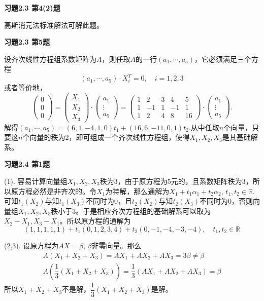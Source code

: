 \newpageorvspace

{\bf 习题2.3 第4(2)题}

高斯消元法标准解法可解此题。

\newpageorvspace

{\bf 习题2.3 第5题}

设齐次线性方程组系数矩阵为$A$，则任取$A$的一行$(a_1,\cdots,a_5)$，它必须满足三个方程
$$(a_1,\cdots,a_5) \cdot X_i^T = 0, \quad i=1,2,3$$
或者等价地，
$$\begin{pmatrix} 0 \\ 0 \\ 0 \end{pmatrix} = \begin{pmatrix} X_1 \\ X_2 \\ X_3 \end{pmatrix} \cdot \begin{pmatrix} a_1 \\ \vdots \\ a_5 \end{pmatrix} = \begin{pmatrix} 1 & 2 & 3 & 4 & 5 \\ 1 & -1 & 1 & -1 & 1 \\ 1 & 2 & 4 & 8 & 16 \end{pmatrix} \cdot \begin{pmatrix} a_1 \\ \vdots \\ a_5 \end{pmatrix}.$$
解得$(a_1,\cdots,a_5) = (6,1,-4,1,0) t_1 + (16,6,-11,0,1) t_2$.从中任取$n$个向量，只要这$n$个向量的秩为$2$，即可组成一个齐次线性方程组，使得$X_1,X_2,X_3$是其基础解系。

\newpageorvspace

{\bf 习题2.4 第1题}

(1). 容易计算向量组$X_1,X_2,X_3$秩为3，由于原方程为5元的，且系数矩阵秩为3，所以原方程必然是非齐次的。令$X_1$为特解，那么通解为$X_1+t_1\alpha_1+t_2\alpha_2$, $t_1,t_2\in\mathbb{R}$. 可知$t_1(X_2)$与知$t_1(X_3)$不同时为0，且$t_2(X_2)$与知$t_2(X_3)$不同时为0，否则向量组$X_1,X_2,X_3$秩小于3。于是相应齐次方程组的基础解系可以取为$X_2-X_1,X_3-X_1$。所以原方程的通解为
$$(1,1,1,1,1) + t_1(0,1,2,3,4) + t_2(0,-1,-4,-3,-4), \quad t_1,t_2\in\mathbb{R}$$

(2,3). 设原方程为$AX = \beta$, $\beta$非零向量。那么
\begin{gather*}
A(X_1+X_2+X_3)= AX_1+AX_2+AX_3 = 3\beta \neq \beta \\
A\left(\dfrac{1}{3}(X_1+X_2+X_3)\right)= \dfrac{1}{3}(AX_1+AX_2+AX_3) = \beta
\end{gather*}
所以$X_1+X_2+X_3$不是解，$\dfrac{1}{3}(X_1+X_2+X_3)$是解。

